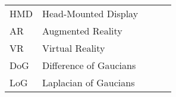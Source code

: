 \begin{table}[h]
\begin{tabular}{|l|l|lll}
\label{table:acronim}
\cline{1-2}
HMD & Head-Mounted Display   &  &  &  \\ \cline{1-2}
AR  & Augmented Reality      &  &  &  \\ \cline{1-2}
VR  & Virtual Reality      &  &  &  \\ \cline{1-2}
DoG & Difference of Gaucians &  &  &  \\ \cline{1-2}
LoG & Laplacian of Gaucians  &  &  &  \\ \cline{1-2}
\end{tabular}
\end{table}